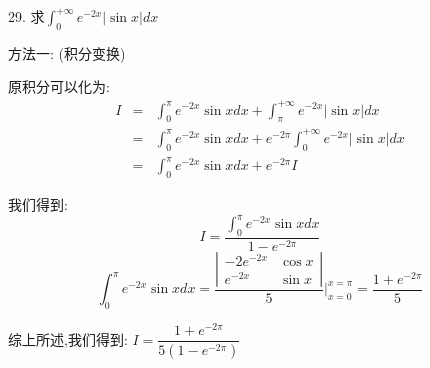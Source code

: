 29. 求$\int_{0}^{+\infty}e^{-2x}|\sin x|dx$
\begin{solution}
	
	方法一:  (积分变换)
	
	原积分可以化为:  
	\begin{eqnarray*}
		I&=&\int_{0}^{\pi}e^{-2x}\sin xdx+\int_{\pi}^{+\infty}e^{-2x}|\sin x|dx\\
		&=&\int_{0}^{\pi}e^{-2x}\sin xdx+e^{-2\pi}\int_{0}^{+\infty}e^{-2x}|\sin x|dx\\
		&=&\int_{0}^{\pi}e^{-2x}\sin xdx+e^{-2\pi}I
	\end{eqnarray*}

	我们得到:  
	$$I=\dfrac{\int_{0}^{\pi}e^{-2x}\sin xdx}{1-e^{-2\pi}}$$
	$$\int_{0}^{\pi}e^{-2x}\sin xdx=\dfrac{\left|\begin{matrix}
			-2e^{-2x}&\cos x\\e^{-2x}&\sin x \end{matrix}\right| }{5}|_{x=0}^{x=\pi}=\dfrac{1+e^{-2\pi}}{5}$$
	
	综上所述,我们得到:  $I=\dfrac{1+e^{-2\pi}}{5(1-e^{-2\pi})}$
\end{solution}
